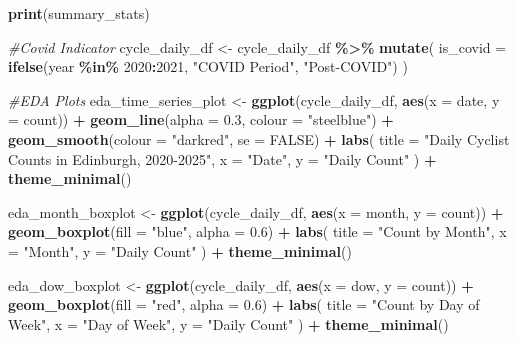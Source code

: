 \documentclass[
]{article}
\newenvironment{Shaded}{\begin{snugshade}}{\end{snugshade}}
\newcommand{\AttributeTok}[1]{\textcolor[rgb]{0.13,0.29,0.53}{#1}}
\newcommand{\CommentTok}[1]{\textcolor[rgb]{0.56,0.35,0.01}{\textit{#1}}}
\newcommand{\ConstantTok}[1]{\textcolor[rgb]{0.56,0.35,0.01}{#1}}
\newcommand{\DecValTok}[1]{\textcolor[rgb]{0.00,0.00,0.81}{#1}}
\newcommand{\FloatTok}[1]{\textcolor[rgb]{0.00,0.00,0.81}{#1}}
\newcommand{\FunctionTok}[1]{\textcolor[rgb]{0.13,0.29,0.53}{\textbf{#1}}}
\newcommand{\NormalTok}[1]{#1}
\newcommand{\OtherTok}[1]{\textcolor[rgb]{0.56,0.35,0.01}{#1}}
\newcommand{\SpecialCharTok}[1]{\textcolor[rgb]{0.81,0.36,0.00}{\textbf{#1}}}
\newcommand{\StringTok}[1]{\textcolor[rgb]{0.31,0.60,0.02}{#1}}
\begin{document}
\begin{Shaded}
\begin{Highlighting}[]
\FunctionTok{print}\NormalTok{(summary\_stats)}

\CommentTok{\#Covid Indicator}
\NormalTok{cycle\_daily\_df }\OtherTok{\textless{}{-}}\NormalTok{ cycle\_daily\_df }\SpecialCharTok{\%\textgreater{}\%}
  \FunctionTok{mutate}\NormalTok{(}
    \AttributeTok{is\_covid =} \FunctionTok{ifelse}\NormalTok{(year }\SpecialCharTok{\%in\%} \DecValTok{2020}\SpecialCharTok{:}\DecValTok{2021}\NormalTok{, }\StringTok{"COVID Period"}\NormalTok{, }\StringTok{"Post{-}COVID"}\NormalTok{)}
\NormalTok{  )}


\CommentTok{\#EDA Plots}
\NormalTok{eda\_time\_series\_plot }\OtherTok{\textless{}{-}} \FunctionTok{ggplot}\NormalTok{(cycle\_daily\_df, }\FunctionTok{aes}\NormalTok{(}\AttributeTok{x =}\NormalTok{ date, }\AttributeTok{y =}\NormalTok{ count)) }\SpecialCharTok{+}
  \FunctionTok{geom\_line}\NormalTok{(}\AttributeTok{alpha =} \FloatTok{0.3}\NormalTok{, }\AttributeTok{colour =} \StringTok{"steelblue"}\NormalTok{) }\SpecialCharTok{+}
  \FunctionTok{geom\_smooth}\NormalTok{(}\AttributeTok{colour =} \StringTok{"darkred"}\NormalTok{, }\AttributeTok{se =} \ConstantTok{FALSE}\NormalTok{) }\SpecialCharTok{+}
  \FunctionTok{labs}\NormalTok{(}
    \AttributeTok{title =} \StringTok{"Daily Cyclist Counts in Edinburgh, 2020{-}2025"}\NormalTok{,}
    \AttributeTok{x =} \StringTok{"Date"}\NormalTok{,}
    \AttributeTok{y =} \StringTok{"Daily Count"}
\NormalTok{  ) }\SpecialCharTok{+}
  \FunctionTok{theme\_minimal}\NormalTok{()}

\NormalTok{eda\_month\_boxplot }\OtherTok{\textless{}{-}} \FunctionTok{ggplot}\NormalTok{(cycle\_daily\_df, }\FunctionTok{aes}\NormalTok{(}\AttributeTok{x =}\NormalTok{ month, }\AttributeTok{y =}\NormalTok{ count)) }\SpecialCharTok{+}
  \FunctionTok{geom\_boxplot}\NormalTok{(}\AttributeTok{fill =} \StringTok{"blue"}\NormalTok{, }\AttributeTok{alpha =} \FloatTok{0.6}\NormalTok{) }\SpecialCharTok{+}
  \FunctionTok{labs}\NormalTok{(}
    \AttributeTok{title =} \StringTok{"Count by Month"}\NormalTok{,}
    \AttributeTok{x =} \StringTok{"Month"}\NormalTok{,}
    \AttributeTok{y =} \StringTok{"Daily Count"}
\NormalTok{  ) }\SpecialCharTok{+}
  \FunctionTok{theme\_minimal}\NormalTok{()}

\NormalTok{eda\_dow\_boxplot }\OtherTok{\textless{}{-}} \FunctionTok{ggplot}\NormalTok{(cycle\_daily\_df, }\FunctionTok{aes}\NormalTok{(}\AttributeTok{x =}\NormalTok{ dow, }\AttributeTok{y =}\NormalTok{ count)) }\SpecialCharTok{+}
  \FunctionTok{geom\_boxplot}\NormalTok{(}\AttributeTok{fill =} \StringTok{"red"}\NormalTok{, }\AttributeTok{alpha =} \FloatTok{0.6}\NormalTok{) }\SpecialCharTok{+}
  \FunctionTok{labs}\NormalTok{(}
    \AttributeTok{title =} \StringTok{"Count by Day of Week"}\NormalTok{,}
    \AttributeTok{x =} \StringTok{"Day of Week"}\NormalTok{,}
    \AttributeTok{y =} \StringTok{"Daily Count"}
\NormalTok{  ) }\SpecialCharTok{+}
  \FunctionTok{theme\_minimal}\NormalTok{()}


\end{Highlighting}
\end{Shaded}
\end{document}
